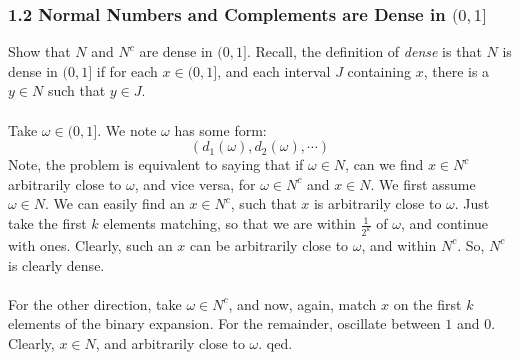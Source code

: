 \documentclass[12pt,a4paper]{article}
\newcommand{\1}[1]{\mathbbm{1}\left\{ #1 \right\}}
\begin{document}
\subsubsection{1.2 Normal Numbers and Complements are Dense in $(0,1]$} Show that $N$ and $N^c$ are dense in $(0,1]$. Recall, the definition of \textit{dense} is that $N$ is dense in $(0,1]$ if for each $x \in (0,1]$, and each interval $J$ containing $x$, there is a $y \in N$ such that $y \in J$.
\\\\
Take $\omega \in (0,1]$. We note $\omega$ has some form:
$$
	(d_1(\omega),d_2(\omega), \cdots)
$$
Note, the problem is equivalent to saying that if $\omega \in N$, can we find $x \in N^c$ arbitrarily close to $\omega$, and vice versa, for $\omega \in N^c$ and $x \in N$. We first assume $\omega \in N$. We can easily find an $x \in N^c$, such that $x$ is arbitrarily close to $\omega$. Just take the first $k$ elements matching, so that we are within $\frac{1}{2^k}$ of $\omega$, and continue with ones. Clearly, such an $x$ can be arbitrarily close to $\omega$, and within $N^c$. So, $N^c$ is clearly dense.
\\\\
For the other direction, take $\omega \in N^c$, and now, again, match $x$ on the first $k$ elements of the binary expansion. For the remainder, oscillate between $1$ and $0$. Clearly, $x \in N$, and arbitrarily close to $\omega$. qed.
\end{document}
